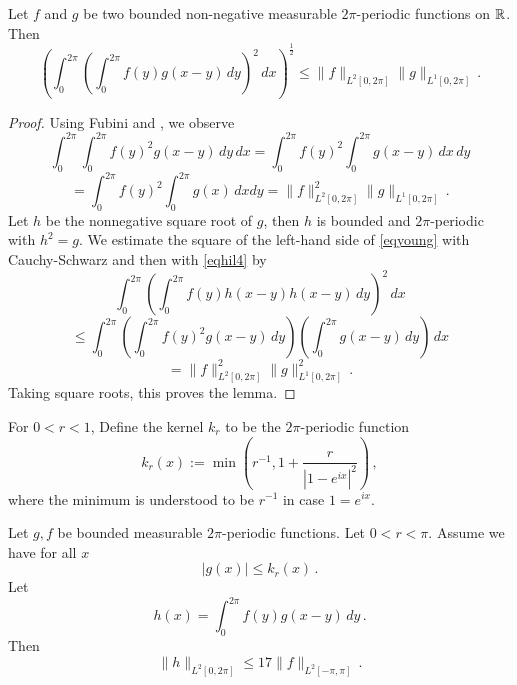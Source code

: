\begin{lemma}\label{Young-convolution}
\leanok
{}
    Let $f$ and $g$ be two bounded non-negative measurable $2\pi$-periodic functions on ${\mathbb{R}}$. Then
    \begin{equation}\label{eqyoung}
        \left(\int_0^{2\pi} \left(\int_0^{2\pi}
        f(y)g(x-y)\, dy\right)^2\, dx\right)^{\frac 12}\le \|f\|_{L^2[0, 2\pi]} \|g\|_{L^1[0, 2\pi]}\, .
    \end{equation}
    \end{lemma}
\begin{proof}
\leanok
    Using Fubini and , we observe
\begin{equation*}
  \int_0^{2\pi}\int_0^{2\pi}f(y)^2g(x-y)\, dy
    \, dx=\int_0^{2\pi}f(y)^2\int_0^{2\pi}g(x-y)\, dx
    \, dy
\end{equation*}
\begin{equation}\label{eqhil4}
=\int_0^{2\pi}f(y)^2\int_0^{2\pi}g(x) \, dx
     dy
=\|f\|_{L^2[0, 2\pi]}^2\|g\|_{L^1[0, 2\pi]}\, .
\end{equation}
   Let $h$ be the nonnegative square root of $g$, then
   $h$ is bounded and $2\pi$-periodic with $h^2=g$.
   We estimate the square of the left-hand side of
   \eqref{eqyoung} with Cauchy-Schwarz and then with
   \eqref{eqhil4} by
       \begin{equation*}
         \int_0^{2\pi} (\int_0^{2\pi}f(y)h(x-y)h(x-y)\, dy)^2\, dx
   \end{equation*}
\begin{equation*}
    \le \int_0^{2\pi}\left(\int_0^{2\pi}f(y)^2g(x-y)\, dy\right)
    \left(\int_0^{2\pi}g(x-y)\, dy\right)\, dx
\end{equation*}
\begin{equation*}
    = \|f\|_{L^2[0, 2\pi]}^2\|g\|_{L^1[0, 2\pi]}^2\, .
\end{equation*}
Taking square roots, this proves the lemma.
\end{proof}

For $0<r<1$, Define the kernel $k_r$ to be the $2\pi$-periodic function
\begin{equation}
    k_r(x):=\min \left(r^{-1}, 1+\frac r{|1-e^{ix}|^2}\right)\, ,
\end{equation}
where the minimum is understood to be $r^{-1}$ in case $1=e^{ix}$.
\begin{lemma}
\label{integrable-bump-convolution}
\leanok
{}
Let $g,f$ be bounded measurable $2\pi$-periodic functions. Let $0<r<\pi$.
Assume we have for all $x$
\begin{equation}\label{ebump1}
    |g(x)|\le k_r(x)\, .
\end{equation}
Let
\begin{equation}
   h(x)= \int_0^{2\pi} f(y)g(x-y)\, dy \, .
\end{equation}
Then
\begin{equation}
   \|h\|_{L^2[0, 2\pi]}\le 17\|f\|_{L^2[-\pi, \pi]} \, .
\end{equation}

\end{lemma}

